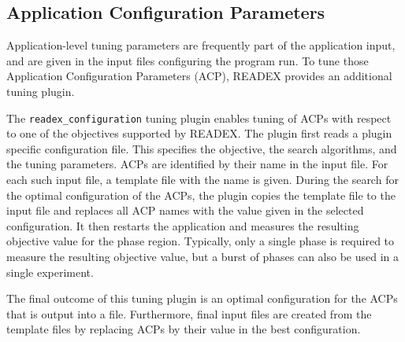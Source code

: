 \subsection{Application Configuration Parameters} \label{sec:acp}

Application-level tuning parameters are frequently part of the application input, and are given in the input files configuring the program run. To tune those Application Configuration Parameters (ACP), READEX provides an additional tuning plugin. 

The \texttt{readex\_configuration} tuning plugin enables tuning of ACPs with respect to one of the objectives supported by READEX. The plugin first reads a plugin specific configuration file. This specifies the objective, the search algorithms, and the tuning parameters. ACPs are identified by their name in the input file. For each such input file, a template file with the name is given. During the search for the optimal configuration of the ACPs, the plugin copies the template file to the input file and replaces all ACP names with the value given in the selected configuration. It then restarts the application and measures the resulting objective value for the phase region. Typically, only a single phase is required to measure the resulting objective value, but a burst of phases can also be used in a single experiment. 

The final outcome of this tuning plugin is an optimal configuration for the ACPs that is output into a file. Furthermore, final input files are created from the template files by replacing ACPs by their value in the best configuration.